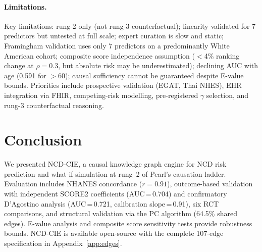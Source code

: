 \documentclass[runningheads]{llncs}
\begin{document}
\paragraph{Limitations.}
Key limitations: rung-2 only (not rung-3 counterfactual); linearity
validated for 7 predictors but untested at full scale; expert curation
is slow and static; Framingham validation uses only 7 predictors on a
predominantly White American cohort; composite score independence
assumption ($<$4\% ranking change at $\rho=0.3$, but absolute risk
may be underestimated); declining AUC with age (0.591 for $>$60);
causal sufficiency cannot be guaranteed despite E-value bounds.
Priorities include prospective validation (EGAT, Thai NHES),
EHR integration via FHIR, competing-risk modelling,
pre-registered $\gamma$ selection, and rung-3 counterfactual
reasoning.

\section{Conclusion}\label{sec:conclusion}

We presented NCD-CIE, a causal knowledge graph engine for NCD risk
prediction and what-if simulation at rung~2 of Pearl's causation
ladder.
Evaluation includes NHANES concordance ($r = 0.91$), outcome-based
validation with independent SCORE2 coefficients (AUC\,=\,0.704)
and confirmatory D'Agostino analysis (AUC\,=\,0.721,
calibration slope\,=\,0.91), six RCT comparisons, and structural
validation via the PC algorithm (64.5\% shared edges).
E-value analysis and composite score sensitivity tests provide
robustness bounds.
NCD-CIE is available open-source with the complete 107-edge
specification in Appendix~\ref{app:edges}.
\end{document}
